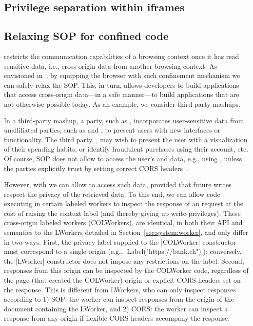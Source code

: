 \subsection{Privilege separation within iframes}
\label{sec:system:extension}


\subsection{Relaxing SOP for confined code}
\label{sec:system:mashup}
%
\sys{} restricts the communication capabilities of a
browsing context once it has read sensitive data, i.e., cross-origin
data from another browsing context.
%
As envisioned in~, by equipping the browser with such
confinement mechanism we can safely relax the SOP.
%
This, in turn, allows developers to build applications that access
cross-origin data---in a safe manner---to build applications that are
not otherwise possible today.
%
As an example, we consider third-party mashups.

In a third-party mashup, a party, such as ,
incorporates user-sensitive data from unaffiliated parties, such as
 and , to present users with new
interfaces or functionality.
%
The third party, , may wish to present the user with a
visualization of their spending habits, or identify fraudulent
 purchases using their  account, etc.
%
Of course, SOP does not allow  to access the user's
 and data, e.g., using \xhr{}, unless
the parties explicitly trust  by setting correct CORS
headers~.

However, with \sys{} we can allow  to access such data,
provided that future writes respect the privacy of the retrieved data.
%
To this end, we can allow code executing in certain labeled workers to
inspect the response of an \xhr{} request at the cost of raising the
context label (and thereby giving up write-privileges).
%
These cross-origin labeled workers (COLWorkers), are identical, in
both their API and semantics to the LWorkers detailed in
Section~\ref{sec:system:worker}, and only differ in two ways.
%
First, the privacy label supplied to the \js|COLWorker| constructor
must correspond to a single origin (e.g.,
\js|Label("https://bank.ch")|); conversely, the \js|LWorker|
constructor does not impose any restrictions on the label.
%
Second, \xhr{} responses from this origin can be inspected by the
COLWorker code, regardless of the page (that created the COLWorker)
origin or explicit CORS headers set on the response.
%
This is different from LWorkers, who can only inspect \xhr{} responses
according to 1) SOP: the worker can inspect responses from the origin
of the document containing the LWorker, and 2) CORS: the worker can
inspect a response from any origin if flexible CORS headers accompany
the response.

